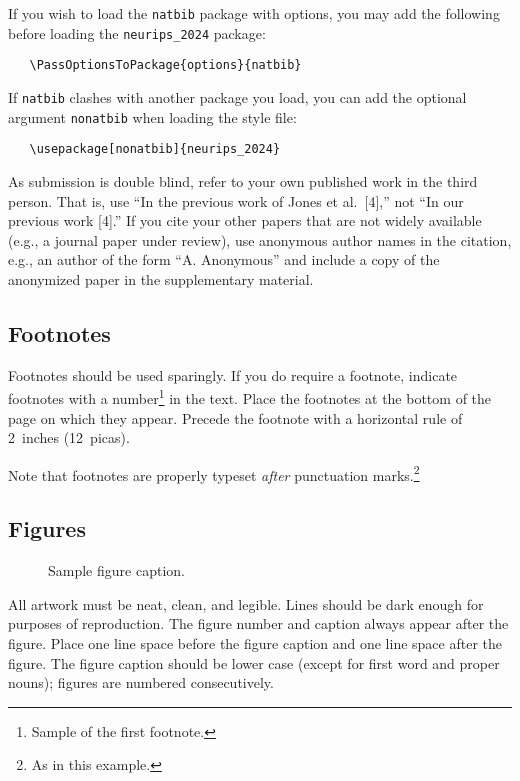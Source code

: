 \documentclass{article}
\begin{document}
If you wish to load the \verb+natbib+ package with options, you may add the
following before loading the \verb+neurips_2024+ package:
\begin{verbatim}
   \PassOptionsToPackage{options}{natbib}
\end{verbatim}

If \verb+natbib+ clashes with another package you load, you can add the optional
argument \verb+nonatbib+ when loading the style file:
\begin{verbatim}
   \usepackage[nonatbib]{neurips_2024}
\end{verbatim}

As submission is double blind, refer to your own published work in the third
person. That is, use ``In the previous work of Jones et al.\ [4],'' not ``In our
previous work [4].'' If you cite your other papers that are not widely available
(e.g., a journal paper under review), use anonymous author names in the
citation, e.g., an author of the form ``A. Anonymous'' and include a copy of the anonymized paper in the supplementary material.

\subsection{Footnotes}

Footnotes should be used sparingly.  If you do require a footnote, indicate
footnotes with a number\footnote{Sample of the first footnote.} in the
text. Place the footnotes at the bottom of the page on which they appear.
Precede the footnote with a horizontal rule of 2~inches (12~picas).

Note that footnotes are properly typeset \emph{after} punctuation
marks.\footnote{As in this example.}

\subsection{Figures}

\begin{figure}
  \centering
  \fbox{\rule[-.5cm]{0cm}{4cm} \rule[-.5cm]{4cm}{0cm}}
  \caption{Sample figure caption.}
\end{figure}

All artwork must be neat, clean, and legible. Lines should be dark enough for
purposes of reproduction. The figure number and caption always appear after the
figure. Place one line space before the figure caption and one line space after
the figure. The figure caption should be lower case (except for first word and
proper nouns); figures are numbered consecutively.
\end{document}
